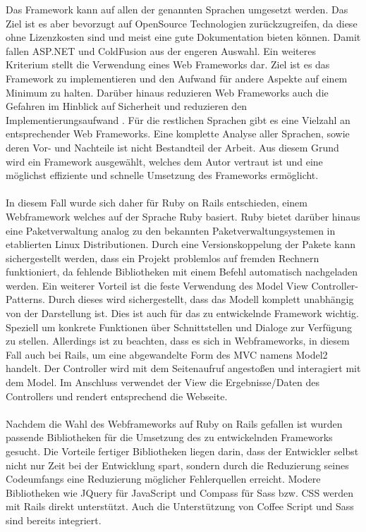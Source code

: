Das Framework kann auf allen der genannten Sprachen umgesetzt werden.
Das Ziel ist es aber bevorzugt auf OpenSource Technologien zurückzugreifen, da diese ohne Lizenzkosten sind und meist eine gute Dokumentation bieten können. Damit fallen ASP.NET und ColdFusion aus der engeren Auswahl. Ein weiteres Kriterium stellt die Verwendung eines Web Frameworks dar. Ziel ist es das Framework zu implementieren und den Aufwand für andere Aspekte auf einem Minimum zu halten. Darüber hinaus reduzieren Web Frameworks auch die Gefahren im Hinblick auf Sicherheit \cite{Livshits.2007} und reduzieren den Implementierungsaufwand \cite{Schwabe.2001}. Für die restlichen Sprachen gibt es eine Vielzahl an entsprechender Web Frameworks.\cite{Weinberger.2011} Eine komplette Analyse aller Sprachen, sowie deren Vor- und Nachteile ist nicht Bestandteil der Arbeit. Aus diesem Grund wird ein Framework ausgewählt, welches dem Autor vertraut ist und eine möglichst effiziente und schnelle Umsetzung des Frameworks ermöglicht.
\\\\
In diesem Fall wurde sich daher für \glqq Ruby on Rails\grqq{} entschieden, einem Webframework welches auf der Sprache Ruby basiert. Ruby bietet darüber hinaus eine Paketverwaltung analog zu den bekannten Paketverwaltungsystemen in etablierten Linux Distributionen.\cite{Bachle.2007} Durch eine Versionskoppelung der Pakete kann sichergestellt werden, dass ein Projekt problemlos auf fremden Rechnern funktioniert, da fehlende Bibliotheken mit einem Befehl automatisch nachgeladen werden.
Ein weiterer Vorteil ist die feste Verwendung des Model View Controller-Patterns.\cite{Tate.2006} Durch dieses wird sichergestellt, dass das Modell komplett unabhängig von der Darstellung ist. Dies ist auch für das zu entwickelnde Framework wichtig. Speziell um konkrete Funktionen über Schnittstellen  und Dialoge zur Verfügung zu stellen. Allerdings ist zu beachten, dass es sich in Webframeworks, in diesem Fall auch bei Rails, um eine abgewandelte Form des MVC namens Model2 handelt.\cite{Qiuhui.2002} Der Controller wird mit dem Seitenaufruf angestoßen und interagiert mit dem Model. Im Anschluss verwendet der View die Ergebnisse/Daten des Controllers und rendert entsprechend die Webseite.
\\\\
Nachdem die Wahl des Webframeworks auf Ruby on Rails gefallen ist wurden passende Bibliotheken für die Umsetzung des zu entwickelnden Frameworks gesucht. 
Die Vorteile fertiger Bibliotheken liegen darin, dass der Entwickler selbst nicht nur Zeit bei der Entwicklung spart, sondern durch die Reduzierung seines Codeumfangs eine Reduzierung möglicher Fehlerquellen erreicht.
Modere Bibliotheken wie JQuery für JavaScript und Compass für Sass bzw. CSS werden mit Rails direkt unterstützt. Auch die Unterstützung von Coffee Script und Sass sind bereits integriert.

